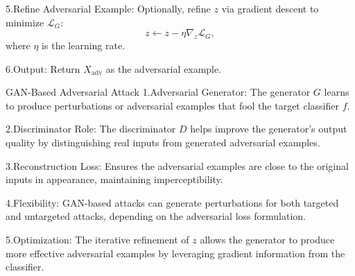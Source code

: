 5.Refine Adversarial Example:
   Optionally, refine $z$ via gradient descent to minimize $\mathcal{L}_G$:
   \[
   z \leftarrow z - \eta \nabla_z \mathcal{L}_G,
   \]
   where $\eta$ is the learning rate.

6.Output:
   Return $X_{\text{adv}}$ as the adversarial example.

GAN-Based Adversarial Attack
1.Adversarial Generator: The generator $G$ learns to produce perturbations or adversarial examples that fool the target classifier $f$.

2.Discriminator Role: The discriminator $D$ helps improve the generator's output quality by distinguishing real inputs from generated adversarial examples.

3.Reconstruction Loss: Ensures the adversarial examples are close to the original inputs in appearance, maintaining imperceptibility.

4.Flexibility: GAN-based attacks can generate perturbations for both targeted and untargeted attacks, depending on the adversarial loss formulation.

5.Optimization: The iterative refinement of $z$ allows the generator to produce more effective adversarial examples by leveraging gradient information from the classifier.

